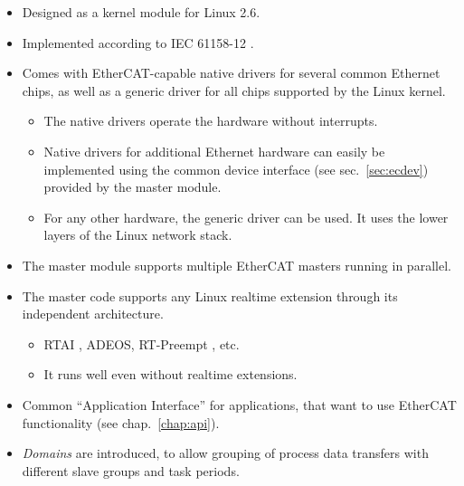 \documentclass[a4paper,12pt,BCOR6mm,bibtotoc,idxtotoc]{scrbook}
\begin{document}
\begin{itemize}

\item Designed as a kernel module for Linux 2.6.

\item Implemented according to IEC 61158-12 \cite{dlspec} \cite{alspec}.

\item Comes with EtherCAT-capable native drivers for several common Ethernet
chips, as well as a generic driver for all chips supported by the Linux
kernel.

  \begin{itemize}

  \item The native drivers operate the hardware without interrupts.

  \item Native drivers for additional Ethernet hardware can easily be
  implemented using the common device interface (see sec.~\ref{sec:ecdev})
  provided by the master module.

  \item For any other hardware, the generic driver can be used. It uses the
  lower layers of the Linux network stack.

  \end{itemize}

\item The master module supports multiple EtherCAT masters running in
parallel.

\item The master code supports any Linux realtime extension through its
independent architecture.

  \begin{itemize}

  \item RTAI \cite{rtai},
  ADEOS, RT-Preempt \cite{rt-preempt}, etc.

  \item It runs well even without realtime extensions.

  \end{itemize}

\item Common ``Application Interface'' for applications, that want to use
EtherCAT functionality (see chap.~\ref{chap:api}).

\item \textit{Domains} are introduced, to allow grouping of process
  data transfers with different slave groups and task periods.


\end{itemize}
\end{document}
